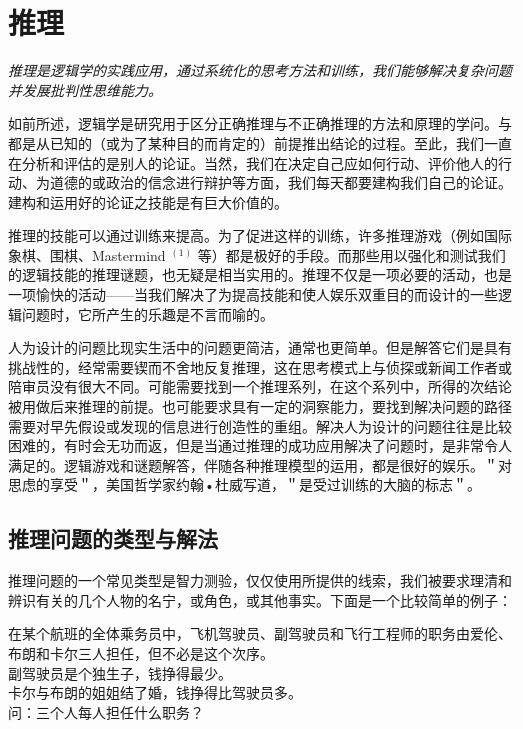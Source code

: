 \section{推理}

\begin{logicbox}[title=引言]
\textit{推理是逻辑学的实践应用，通过系统化的思考方法和训练，我们能够解决复杂问题并发展批判性思维能力。}
\end{logicbox}

如前所述，逻辑学是研究用于区分正确推理与不正确推理的方法和原理的学问。与都是从已知的（或为了某种目的而肯定的）前提推出结论的过程。至此，我们一直在分析和评估的是别人的论证。当然，我们在决定自己应如何行动、评价他人的行动、为道德的或政治的信念进行辩护等方面，我们每天都要建构我们自己的论证。建构和运用好的论证之技能是有巨大价值的。

推理的技能可以通过训练来提高。为了促进这样的训练，许多推理游戏（例如国际象棋、围棋、Mastermind ${ }^{(1)}$ 等）都是极好的手段。而那些用以强化和测试我们的逻辑技能的推理谜题，也无疑是相当实用的。推理不仅是一项必要的活动，也是一项愉快的活动——当我们解决了为提高技能和使人娱乐双重目的而设计的一些逻辑问题时，它所产生的乐趣是不言而喻的。

人为设计的问题比现实生活中的问题更简洁，通常也更简单。但是解答它们是具有挑战性的，经常需要锲而不舍地反复推理，这在思考模式上与侦探或新闻工作者或陪审员没有很大不同。可能需要找到一个推理系列，在这个系列中，所得的次结论被用做后来推理的前提。也可能要求具有一定的洞察能力，要找到解决问题的路径需要对早先假设或发现的信息进行创造性的重组。解决人为设计的问题往往是比较困难的，有时会无功而返，但是当通过推理的成功应用解决了问题时，是非常令人满足的。逻辑游戏和谜题解答，伴随各种推理模型的运用，都是很好的娱乐。＂对思虑的享受＂，美国哲学家约翰•杜威写道，＂是受过训练的大脑的标志＂。


\subsection{推理问题的类型与解法}

推理问题的一个常见类型是智力测验，仅仅使用所提供的线索，我们被要求理清和辨识有关的几个人物的名宁，或角色，或其他事实。下面是一个比较简单的例子：

\begin{displayquote}
在某个航班的全体乘务员中，飞机驾驶员、副驾驶员和飞行工程师的职务由爱伦、布朗和卡尔三人担任，但不必是这个次序。\\
副驾驶员是个独生子，钱挣得最少。\\
卡尔与布朗的姐姐结了婚，钱挣得比驾驶员多。\\
问：三个人每人担任什么职务？
\end{displayquote}

